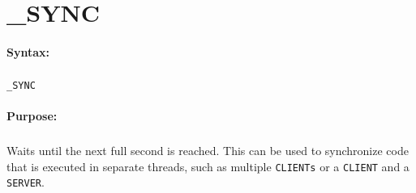
\newpage
\section{\_SYNC}
\label{cmd:_SYNC}

\paragraph{Syntax:}
\subparagraph{}
\texttt{\_SYNC}

\paragraph{Purpose:}
\subparagraph{}
Waits until the next full second is reached. This can be 
used to synchronize code that is executed in separate 
threads, such as multiple \texttt{CLIENTs} or a \texttt{CLIENT} 
and a \texttt{SERVER}.